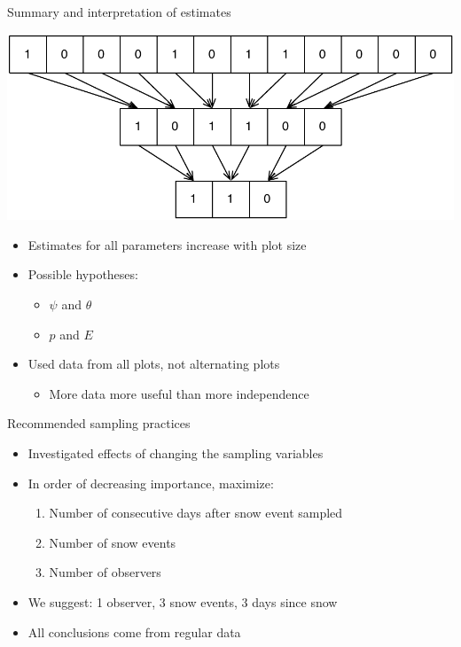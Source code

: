 \documentclass{beamer}
\begin{document}

\begin{frame}{Summary and interpretation of estimates}
	\begin{center}
		\includegraphics[scale=0.5]{Aggregation.pdf}
	\end{center}
	\begin{itemize}
		\item Estimates for all parameters increase with plot size
		\item Possible hypotheses:
		\begin{itemize}
			\item \(\psi\) and \(\theta\)
			\item \(p\) and \(E\)
		\end{itemize}
		\item Used data from all plots, not alternating plots
		\begin{itemize}
			\item More data more useful than more independence
		\end{itemize}
	\end{itemize}
\end{frame}

\begin{frame}{Recommended sampling practices}
	\begin{itemize}
		\item Investigated effects of changing the sampling variables
		\item In order of decreasing importance, maximize:
		\begin{enumerate}
			\item Number of consecutive days after snow event sampled
			\item Number of snow events
			\item Number of observers
		\end{enumerate}
		\item We suggest: 1 observer, 3 snow events, 3 days since snow
		\item All conclusions come from regular data
	\end{itemize}
\end{frame}
\end{document}
